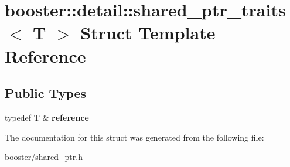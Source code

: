 \section{booster\-:\-:detail\-:\-:shared\-\_\-ptr\-\_\-traits$<$ T $>$ Struct Template Reference}
\label{structbooster_1_1detail_1_1shared__ptr__traits}
\subsection*{Public Types}
\begin{DoxyCompactItemize}
\item 
typedef T \& {\bfseries reference}\label{structbooster_1_1detail_1_1shared__ptr__traits_a74ce07cf17d9ca8b9f09dcd2e9b7ca28}

\end{DoxyCompactItemize}


The documentation for this struct was generated from the following file\-:\begin{DoxyCompactItemize}
\item 
booster/shared\-\_\-ptr.\-h\end{DoxyCompactItemize}
